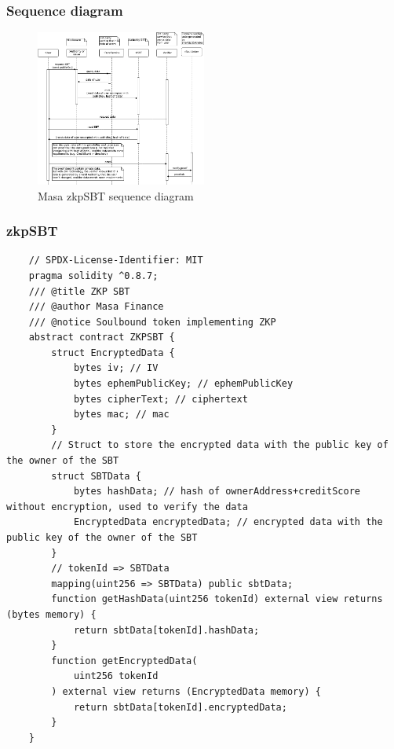 \documentclass{article}
\begin{document}
  \subsubsection{Sequence diagram}
    \begin{figure}[h]
        \centering
        \includegraphics[width=0.5\textwidth]{sequence-digram.png}
        \caption{Masa zkpSBT sequence diagram}
      \end{figure}
  \subsubsection{zkpSBT}
  \begin{verbatim}
    // SPDX-License-Identifier: MIT
    pragma solidity ^0.8.7;
    /// @title ZKP SBT
    /// @author Masa Finance
    /// @notice Soulbound token implementing ZKP
    abstract contract ZKPSBT {
        struct EncryptedData {
            bytes iv; // IV
            bytes ephemPublicKey; // ephemPublicKey
            bytes cipherText; // ciphertext
            bytes mac; // mac
        }
        // Struct to store the encrypted data with the public key of the owner of the SBT
        struct SBTData {
            bytes hashData; // hash of ownerAddress+creditScore without encryption, used to verify the data
            EncryptedData encryptedData; // encrypted data with the public key of the owner of the SBT
        }
        // tokenId => SBTData
        mapping(uint256 => SBTData) public sbtData;
        function getHashData(uint256 tokenId) external view returns (bytes memory) {
            return sbtData[tokenId].hashData;
        }
        function getEncryptedData(
            uint256 tokenId
        ) external view returns (EncryptedData memory) {
            return sbtData[tokenId].encryptedData;
        }
    }
    \end{verbatim}
\end{document}
